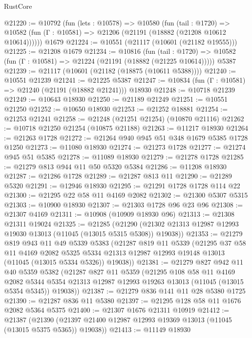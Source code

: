 \begin{lexlean}{RustCore}
\begin{coremodule}
@21220 := @10792
    (fun (lets : @10578) =>
    @10580
      (fun (tail : @1720) =>
      @10582 (fun (Γ : @10581) => @21206 (@21191 (@18882 (@21208 @10612 @10614))))))
    @1679
@21224 := @10551 (@21117 (@10601 (@21182 @19555)))
@21225 := @21208 @1679
@21234 := @10816
    (fun (tail : @1720) => @10582 (fun (Γ : @10581) => @21224 (@21191 (@18882 (@21225 @10614)))))
    @5387
@21239 := @21117 (@10601 (@21182 (@18875 (@10611 @5388))))
@21240 := @10551 @21239
@21241 := @21225 @5387
@21247 := @10834 (fun (Γ : @10581) => @21240 (@21191 (@18882 @21241))) @18930
@21248 := @10718 @21239
@21249 := @10643 @18930
@21250 := @21189 @21249
@21251 := @10551 @21250
@21252 := @10650 @18930
@21253 := @21252 @18881
@21254 := @21253 @21241
@21258 := @21248 (@21251 @21254) (@10870 @21116)
@21262 := @10718 @21250 @21254 (@10875 @21188)
@21263 := @11217 @18930
@21264 := @21263 @1728
@21272 := @21264 @940 @945 @51 @348 @1679 @5385 @1728 @1250
@21273 := @11080 @18930
@21274 := @21273 @1728
@21277 := @21274 @945 @51 @5385
@21278 := @11089 @18930
@21279 := @21278 @1728
@21285 := @21279 @813 @944 @11 @50 @5320 @5384
@21286 := @11208 @18930
@21287 := @21286 @1728
@21289 := @21287 @813 @11
@21290 := @21289 @5320
@21291 := @12946 @18930
@21295 := @21291 @1728 @1728 @114 @22
@21300 := @21295 @22 @58 @11 @4169 @2082
@21302 := @21300 @5307 @5315
@21303 := @10900 @18930
@21307 := @21303 @1728 @96 @23 @96
@21308 := @21307 @4169
@21311 := @10908 (@10909 @18930 @96)
@21313 := @21308 @21311 @19024
@21325 := @21285
    (@21290 (@21302 @21313 @12987 @12993 @19030 @13013 (@11045 (@13015 @5315 @5308)) @19038))
@21353 := @21279
    @819
    @943
    @11
    @49
    @5339
    @5383
    (@21287
      @819
      @11
      @5339
      (@21295
        @37
        @58
        @11
        @4169
        @2082
        @5325
        @5334
        @21313
        @12987
        @12993
        @19148
        @13013
        (@11045 (@13015 @5334 @5326))
        @19038))
@21381 := @21279
    @827
    @942
    @11
    @40
    @5359
    @5382
    (@21287
      @827
      @11
      @5359
      (@21295
        @108
        @58
        @11
        @4169
        @2082
        @5344
        @5354
        @21313
        @12987
        @12993
        @19263
        @13013
        (@11045 (@13015 @5354 @5345))
        @19038))
@21387 := @21279 @836 @141 @11 @28 @5380 @1725
@21390 := @21287 @836 @11 @5380
@21397 := @21295 @128 @58 @11 @1676 @2082 @5364 @5375
@21400 := @21307 @1676 @21311 @10919
@21412 := @21387
    (@21390 (@21397 @21400 @12987 @12993 @19369 @13013 (@11045 (@13015 @5375 @5365)) @19038))
@21413 := @11149 @18930

\end{coremodule}
\end{lexlean}
